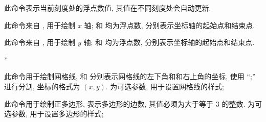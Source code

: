 \documentclass[
  hyper, lang=cn, 
  class=l3dox, 
]{../../zlatex/code/ztex}
\begin{document}
\begin{function}[added=2025-05-31]{\CurrentFp}
  此命令表示当前刻度处的浮点数值, 其值在不同刻度处会自动更新.
\end{function}


\begin{function}[added=2025-05-15]{\xAxis}
  \begin{syntax}
  \end{syntax}
  此命令来自 , 用于绘制 $x$ 轴;  和  均为浮点数, 分别表示坐标轴的起始点和结束点.
\end{function}



\begin{function}[added=2025-05-15]{\yAxis}
  \begin{syntax}
  \end{syntax}
  此命令来自 , 用于绘制 $y$ 轴;  和  均为浮点数, 分别表示坐标轴的起始点和结束点.
\end{function}
\begin{DocExample}*
\end{DocExample}



\begin{function}[added=2025-05-15]{\ShowGrid}
  \begin{syntax}
  \end{syntax}
  此命令用于绘制网格线,  和  分别表示网格线的左下角和和右上角的坐标, 使用 ``;'' 进行分割, 
  坐标的格式为 $(x, y)$.  为可选参数, 用于设置网格线的样式;
\end{function}


\begin{function}[added=2025-05-15]{\Polygon}
  \begin{syntax}
  \end{syntax}
  此命令用于绘制正多边形,  表示多边形的边数, 其值必须为大于等于 3 的整数.
   为可选参数, 用于设置多边形的样式;
\end{function}
\end{document}
